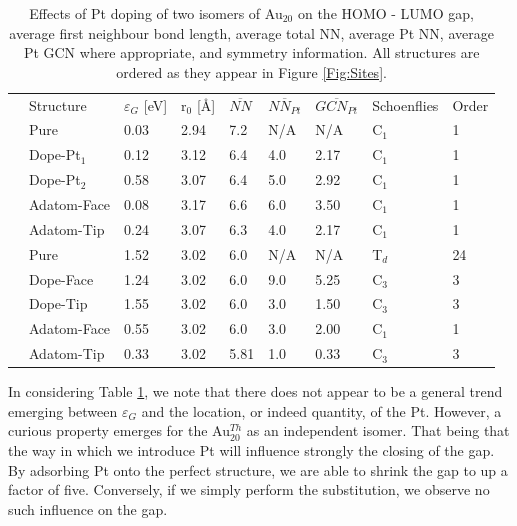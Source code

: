 \begin{table}[ht!]
\centering
\caption{Effects of Pt doping of two isomers of Au$_{20}$ on the HOMO - LUMO gap, average first neighbour bond length, average total NN, average Pt NN, average Pt GCN where appropriate, and symmetry information. All structures are ordered as they appear in Figure \ref{Fig:Sites}.}
\label{tab:table}
\begin{tabular}{lllllllll}
\hline\noalign{\smallskip}
 & Structure & $\varepsilon_{G}$ [eV] & r$_{0}$ [\AA]& $\overline{NN}$ & $\overline{NN_{Pt}}$ & $\overline{GCN_{Pt}}$ & Schoenflies &  Order  \\
\noalign{\smallskip}\hline\noalign{\smallskip}
\multicolumn{1}{l|}{\multirow{5}{*}{C1}} & \multicolumn{1}{l|}{Pure} & 0.03 & 2.94 & 7.2 & N/A & N/A  & C$_{1}$ & 1      \\
\multicolumn{1}{l|}{}                    & \multicolumn{1}{l|}{Dope-Pt$_1$} & 0.12 & 3.12 & 6.4 & 4.0 & 2.17 & C$_{1}$ & 1    \\
\multicolumn{1}{l|}{}                    & \multicolumn{1}{l|}{Dope-Pt$_2$} & 0.58 & 3.07 & 6.4 & 5.0 & 2.92 & C$_{1}$ & 1    \\
\multicolumn{1}{l|}{}                    & \multicolumn{1}{l|}{Adatom-Face} & 0.08 & 3.17 & 6.6 & 6.0 & 3.50 & C$_{1}$ & 1    \\
\multicolumn{1}{l|}{}                    & \multicolumn{1}{l|}{Adatom-Tip}  & 0.24 & 3.07 & 6.3 & 4.0 & 2.17 & C$_{1}$ & 1    \\
\noalign{\smallskip}\hline\noalign{\smallskip}
\multicolumn{1}{l|}{\multirow{6}{*}{Th}} & \multicolumn{1}{l|}{Pure} & 1.52 &  3.02 & 6.0 & N/A & N/A  & T$_{d}$ & 24    \\
\multicolumn{1}{l|}{}                    & \multicolumn{1}{l|}{Dope-Face} & 1.24 & 3.02 & 6.0 & 9.0 & 5.25 & C$_{3}$ & 3     \\
\multicolumn{1}{l|}{} &
\multicolumn{1}{l|}{{Dope-Tip}} & 1.55 & 3.02 &  6.0 & 3.0 & 1.50 & C$_{3}$ & 3  \\
\multicolumn{1}{l|}{}                    & \multicolumn{1}{l|}{Adatom-Face}  & 0.55 & 3.02 & 6.0 & 3.0 &  2.00 & C$_{1}$ & 1\\
\multicolumn{1}{l|}{} &
\multicolumn{1}{l|}{Adatom-Tip}  & 0.33 &  3.02 & 5.81 & 1.0 & 0.33 & C$_{3}$ & 3 \\

\end{tabular}
\end{table}

In considering Table \ref{tab:table}, we note that there does not appear to be a general trend emerging between $\varepsilon_G$ and the location, or indeed quantity, of the Pt. However, a curious property emerges for the Au$^{Th}_{20}$ as an independent isomer. That being that the way in which we introduce Pt will influence strongly the closing of the gap. By adsorbing Pt onto the perfect structure, we are able to shrink the gap to up a factor of five. Conversely, if we simply perform the substitution, we observe no such influence on the gap.

